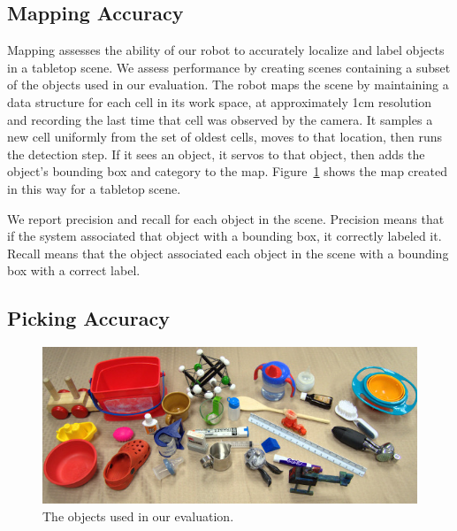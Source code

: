 \documentclass[graybox]{svmult}
\begin{document}
\subsection{Mapping Accuracy}

Mapping assesses the ability of our robot to accurately localize and
label objects in a tabletop scene.  We assess performance by creating
scenes containing a subset of the objects used in our evaluation.  The
robot maps the scene by maintaining a data structure for each cell in
its work space, at approximately 1cm resolution and recording the last
time that cell was observed by the camera.  It samples a new cell
uniformly from the set of oldest cells, moves to that location, then
runs the detection step.  If it sees an object, it servos to that
object, then adds the object's bounding box and category to the map.
Figure~\ref{fig:map} shows the map created in this way for a tabletop
scene.

\begin{figure}
\label{fig:map}
\end{figure}

We report precision and recall for each object in the scene.
Precision means that if the system associated that object with a
bounding box, it correctly labeled it.  Recall means that the object
associated each object in the scene with a bounding box with a correct
label.

\subsection{Picking Accuracy}

\begin{figure}
\includegraphics[width=1\linewidth]{figures/object_glory_shot.jpg}
\caption{The objects used in our evaluation.\label{fig:object_glory_shot}}
\end{figure}
\end{document}
